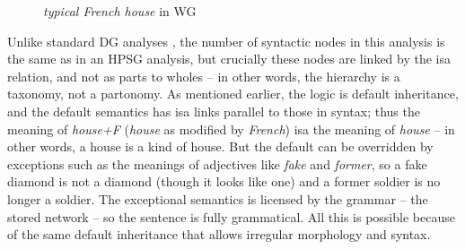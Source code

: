 \documentclass[output=paper
 	        ,biblatex
                ,babelshorthands
                ,newtxmath
                ,draftmode
                ,colorlinks, citecolor=brown
]{langscibook}
\begin{document}
\begin{figure}
	\centering
{}
	\caption{\emph{typical French house} in WG}
	\label{fig:9}
\end{figure}

Unlike standard DG analyses \citep{MuellerEvaluating}, the number of syntactic nodes in this analysis is the same as in an HPSG analysis, but crucially these nodes are linked by the isa relation, and not as parts to wholes – in other words, the hierarchy is a taxonomy, not a partonomy. As mentioned earlier, the logic is default inheritance, and the default semantics has isa links parallel to those in syntax; thus the meaning of \emph{house+F} (\emph{house} as modified by \emph{French}) isa the meaning of \emph{house} – in other words, a  house is a kind of house. But the default can be overridden by exceptions such as the meanings of adjectives like \emph{fake} and \emph{former}, so a fake diamond is not a diamond (though it looks like one) and a former soldier is no longer a soldier. The exceptional semantics is licensed by the grammar – the stored network – so the sentence is fully grammatical. All this is possible because of the same default inheritance that allows irregular morphology and syntax.
\end{document}
